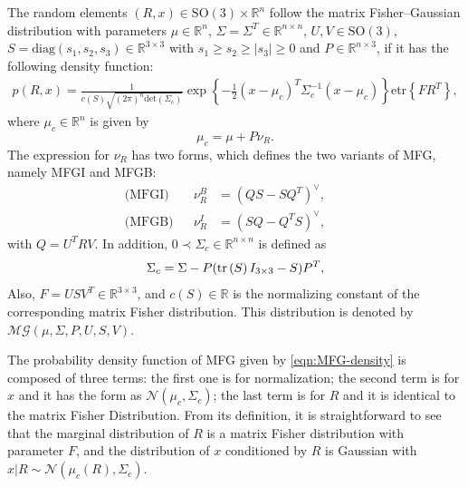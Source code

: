 \begin{definition} \label{def:MFG}
	The random elements $(R,x)\in\mathrm{SO}(3)\times\mathbb{R}^n$ follow the matrix Fisher--Gaussian distribution with parameters $\mu\in\mathbb{R}^n$, $\Sigma=\Sigma^T\in\mathbb{R}^{n\times n}$, $U,V\in\mathrm{SO}(3)$, $S=\mathrm{diag}(s_1,s_2,s_3)\in\mathbb{R}^{3\times 3}$ with $s_1 \geq s_2 \geq |s_3| \geq 0$ and $P\in\mathbb{R}^{n\times 3}$, if it has the following density function:
	\begin{align} \label{eqn:MFG-density}
		p(R,x) = \frac{1}{c(S)\sqrt{(2\pi)^n\mathrm{det}({\Sigma}_c)}}\exp\left\{-\tfrac{1}{2}(x-\mu_c)^T\Sigma_c^{-1}(x-\mu_c)\right\} \mathrm{etr}\left\{FR^T\right\},
	\end{align}
	where  $\mu_c\in\mathbb{R}^n$ is given by
	\begin{equation} \label{eqn:MFG-Miuc}
		\mu_c = \mu+P\nu_R.
	\end{equation}
	The expression for $\nu_R$ has two forms, which defines the two variants of MFG, namely MFGI and MFGB:
	\begin{subequations} \label{eqn:MFG-vR}
		\begin{flalign}
			\text{(MFGI)} && \nu_R^B &= (QS-SQ^T)^\vee, && \label{eqn:MFG-vR-MFGI} \\
			\text{(MFGB)} && \nu_R^I &= (SQ-Q^TS)^\vee, && \label{eqn:MFG-vR-MFGB}
		\end{flalign}
	\end{subequations}
	with ${Q}=U^TRV$.
	In addition, $0\prec {\Sigma}_c\in\mathbb{R}^{n\times n}$ is defined as
	\begin{equation} \label{eqn:MFG-Sigmac}
		\Sigma_c = \Sigma-P(\mathrm{tr}\left( S \right)I_{3\times 3}-S)P^T,
	\end{equation}
	Also, $F=USV^T\in\mathbb{R}^{3\times 3}$, and $c(S)\in\mathbb{R}$ is the normalizing constant of the corresponding matrix Fisher distribution.
	This distribution is denoted by $\mathcal{MG}(\mu,\Sigma,P,U,S,V)$.
\end{definition}

The probability density function of MFG given by \eqref{eqn:MFG-density} is composed of three terms:
the first one is for normalization; the second term is for $x$ and it has the form as $\mathcal{N}(\mu_c, \Sigma_c)$; the last term is for $R$ and it is identical to the matrix Fisher Distribution. 
From its definition, it is straightforward to see that the marginal distribution of $R$ is a matrix Fisher distribution with parameter $F$, and
the distribution of $x$ conditioned by $R$ is Gaussian with $x|R\sim\mathcal{N}(\mu_c(R), \Sigma_c)$. 

